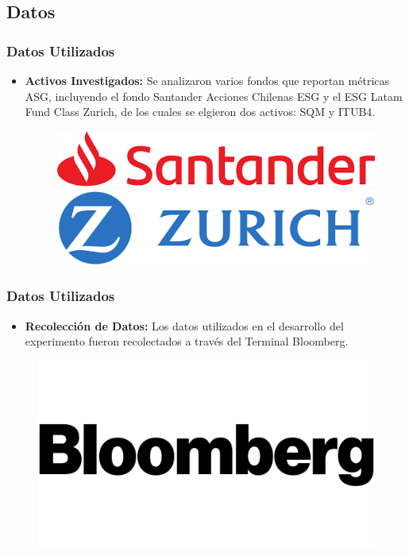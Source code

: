 \documentclass{beamer}
\begin{document}
\subsection{Datos}
\begin{frame}
    \frametitle{Datos Utilizados}
    \begin{itemize}
        \item \textbf{Activos Investigados:} Se analizaron varios fondos que reportan métricas ASG, incluyendo el fondo Santander Acciones Chilenas ESG y el ESG Latam Fund Class Zurich, de los cuales se elgieron dos activos: SQM y ITUB4.
        \begin{figure}[h!]
    \centering
    \begin{minipage}{0.45\linewidth}
        \centering
        \includegraphics[width=\linewidth]{Latex/defensa/logo_santander.png}
    \end{minipage}
    \hspace{0.05\linewidth}
    \begin{minipage}{0.45\linewidth}
        \centering
        \includegraphics[width=\linewidth]{Latex/defensa/logo_zurich.png}
    \end{minipage}
\end{figure}   
    \end{itemize}

\end{frame}

\begin{frame}
    \frametitle{Datos Utilizados}
    \begin{itemize}
        \item \textbf{Recolección de Datos:} Los datos utilizados en el desarrollo del experimento fueron recolectados a través del Terminal Bloomberg.
    \end{itemize}
    \begin{figure}
        \centering
        \includegraphics[width=0.5\linewidth]{Latex/defensa/logo_bloomberg.png}
    \end{figure}
\end{frame}
\end{document}
